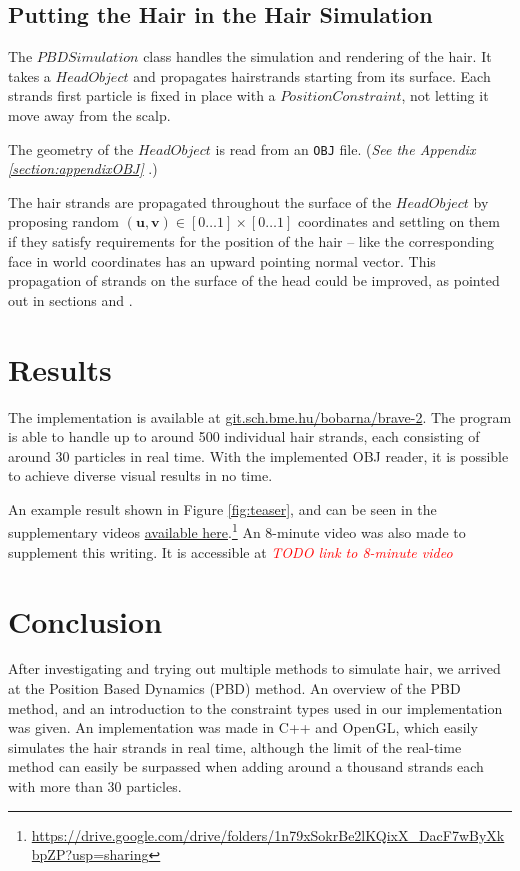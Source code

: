 \documentclass[sigplan,screen,nonacm]{acmart}
\newcommand\TODO[1]{\textcolor{red}{\emph{TODO #1}}}
\renewcommand{\b}{\boldsymbol}
\begin{document}
\subsection{Putting the Hair in the Hair Simulation}
The $PBDSimulation$ class handles the simulation and rendering of the hair. It
takes a $HeadObject$ and propagates hairstrands starting from its surface. Each
strands first particle is fixed in place with a $PositionConstraint$, not
letting it move away from the scalp.

The geometry of the $HeadObject$ is read from an \texttt{OBJ} file. (\emph{See
the Appendix \ref{section:appendixOBJ} }.)

The hair strands are propagated throughout the surface of the $HeadObject$ by
proposing random $(\b{u}, \b{v}) \in [0 \ldots 1] \times [0 \ldots 1]$
coordinates and settling on them if they satisfy requirements for the position
of the hair -- like the corresponding face in world coordinates has an upward
pointing normal vector. This propagation of strands on the surface of the head
could be improved, as pointed out in sections
 and .
 

\section{Results}
The implementation is available at \url{git.sch.bme.hu/bobarna/brave-2}. The
program is able to handle up to around 500 individual hair strands, each
consisting of around 30 particles in real time. With the implemented OBJ reader,
it is possible to achieve diverse visual results in no time.

An example result shown in Figure \ref{fig:teaser}, and can
be seen in the supplementary videos
\href{https://drive.google.com/drive/folders/1n79xSokrBe2lKQixX_DacF7wByXkbpZP?usp=sharing}{available
here}.\footnote{\url{https://drive.google.com/drive/folders/1n79xSokrBe2lKQixX_DacF7wByXkbpZP?usp=sharing}}
An 8-minute video was also made to supplement this writing. It is accessible at
\TODO{link to 8-minute video}

\section{Conclusion}
\label{sec:conclusion}
After investigating and trying out multiple methods to simulate hair, we arrived
at the Position Based Dynamics (PBD) method. An overview of the PBD method, and
an introduction to the constraint types used in our implementation was given.
An implementation was made in C++ and OpenGL, which easily simulates the hair
strands in real time, although the limit of the real-time method can easily be
surpassed when adding around a thousand strands each with more than 30
particles.
\end{document}
